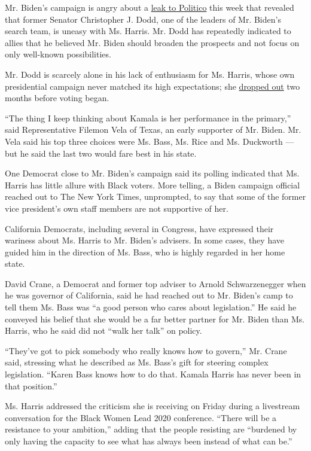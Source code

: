 Mr. Biden's campaign is angry about a
\href{https://www.politico.com/news/2020/07/27/kamala-harris-biden-vp-381829}{leak
to Politico} this week that revealed that former Senator Christopher J.
Dodd, one of the leaders of Mr. Biden's search team, is uneasy with Ms.
Harris. Mr. Dodd has repeatedly indicated to allies that he believed Mr.
Biden should broaden the prospects and not focus on only well-known
possibilities.

Mr. Dodd is scarcely alone in his lack of enthusiasm for Ms. Harris,
whose own presidential campaign never matched its high expectations; she
\href{https://www.nytimes3xbfgragh.onion/2019/11/29/us/politics/kamala-harris-2020.html}{dropped
out} two months before voting began.

``The thing I keep thinking about Kamala is her performance in the
primary,'' said Representative Filemon Vela of Texas, an early supporter
of Mr. Biden. Mr. Vela said his top three choices were Ms. Bass, Ms.
Rice and Ms. Duckworth --- but he said the last two would fare best in
his state.

One Democrat close to Mr. Biden's campaign said its polling indicated
that Ms. Harris has little allure with Black voters. More telling, a
Biden campaign official reached out to The New York Times, unprompted,
to say that some of the former vice president's own staff members are
not supportive of her.

California Democrats, including several in Congress, have expressed
their wariness about Ms. Harris to Mr. Biden's advisers. In some cases,
they have guided him in the direction of Ms. Bass, who is highly
regarded in her home state.

David Crane, a Democrat and former top adviser to Arnold Schwarzenegger
when he was governor of California, said he had reached out to Mr.
Biden's camp to tell them Ms. Bass was ``a good person who cares about
legislation.'' He said he conveyed his belief that she would be a far
better partner for Mr. Biden than Ms. Harris, who he said did not ``walk
her talk'' on policy.

``They've got to pick somebody who really knows how to govern,'' Mr.
Crane said, stressing what he described as Ms. Bass's gift for steering
complex legislation. ``Karen Bass knows how to do that. Kamala Harris
has never been in that position.''

Ms. Harris addressed the criticism she is receiving on Friday during a
livestream conversation for the Black Women Lead 2020 conference.
``There will be a resistance to your ambition,'' adding that the people
resisting are ``burdened by only having the capacity to see what has
always been instead of what can be.''

